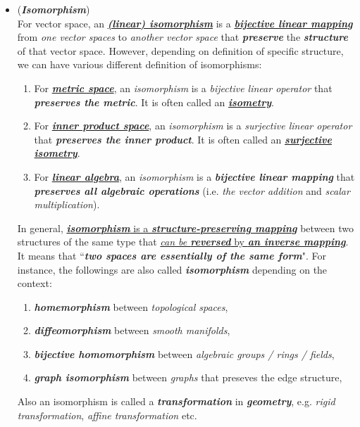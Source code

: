 \documentclass[11pt]{article}
\begin{document}
\begin{itemize}
\item \begin{remark} (\emph{\textbf{Isomorphism}})\\
For vector space, an \underline{\emph{\textbf{(linear) isomorphism}}} is a \underline{\emph{\textbf{bijective linear mapping}}} from \emph{one vector spaces} to \emph{another vector space} that \emph{\textbf{preserve}} the \emph{\textbf{structure}} of that vector space. However, depending on definition of specific structure, we can have various different definition of isomorphisms:
\begin{enumerate}
\item For \underline{\emph{\textbf{metric space}}}, an \emph{isomorphism} is a \emph{bijective linear operator} that \emph{\textbf{preserves the metric}}. It is often called an \underline{\emph{\textbf{isometry}}}.
\item For \underline{\emph{\textbf{inner product space}}}, an \emph{isomorphism} is a \emph{surjective linear operator} that \emph{\textbf{preserves the inner product}}. It is often called an \underline{\emph{\textbf{surjective isometry}}}.
\item For \underline{\emph{\textbf{linear algebra}}}, an \emph{isomorphism} is a \emph{\textbf{bijective linear mapping}} that \emph{\textbf{preserves all algebraic operations}} (i.e. \emph{the vector addition} and \emph{scalar multiplication}).
\end{enumerate}

In general, \underline{\emph{\textbf{isomorphism}} is a \emph{\textbf{structure-preserving mapping}}} between two structures of the same type that \underline{\emph{can be \textbf{reversed}} by \emph{\textbf{an inverse mapping}}}. It means that ``\emph{\textbf{two spaces are essentially of the same form}}". For instance, the followings are also called \emph{\textbf{isomorphism}} depending on the context:
\begin{enumerate}
\item \emph{\textbf{homemorphism}} between \emph{topological spaces},
\item \emph{\textbf{diffeomorphism}} between \emph{smooth manifolds},
\item \emph{\textbf{bijective homomorphism}} between \emph{algebraic groups / rings / fields},
\item \emph{\textbf{graph isomorphism}} between \emph{graphs} that preseves the edge structure,
\end{enumerate}
 Also an isomorphism is called  a \emph{\textbf{transformation}} in \emph{\textbf{geometry}}, e.g. \emph{rigid transformation}, \emph{affine transformation} etc.
\end{remark}


\end{itemize}
\end{document}
